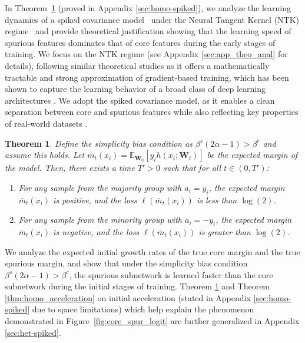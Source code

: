 \documentclass[letter,11pt]{article}
\newtheorem{theorem}{Theorem}
\begin{document}
In Theorem~\ref{thm:thm_1} (proved in Appendix \ref{sec:homo-spiked}), we analyze the learning dynamics of a spiked covariance model~\citep{SCM} under the Neural Tangent Kernel (NTK) regime~\citep{NTK_1} and provide theoretical justification showing that the learning speed of spurious features dominates that of core features during the early stages of training. We focus on the NTK regime (see Appendix \ref{sec:app_theo_anal} for details), following similar theoretical studies \citep{NTK, SPARE} as it offers a mathematically tractable and strong approximation of gradient-based training, which has been shown to capture the learning behavior of a broad class of deep learning architectures \citep{NTK_1, NTK_2}. We adopt the spiked covariance model, as it enables a clean separation between core and spurious features while also reflecting key properties of real-world datasets \citep{SCM_1}.


\begin{theorem}\label{thm:thm_1}
    Define the simplicity bias condition as $\beta^s (2\alpha - 1) > \beta^c$ and assume this holds. Let $\bar{m}_t(x_i) = \mathbb{E}_{\mathbf{W}_0}[y_i h(x_i; \mathbf{W}_t)]$ be the expected margin of the model.
Then, there exists a time $T' > 0$ such that for all $t \in (0, T')$:
\begin{enumerate}
    \item For any sample from the majority group with  $a_i=y_i$, the expected margin $\bar{m}_t(x_i)$ is positive, and the loss $\ell(\bar{m}_t(x_i))$ is less than $\log(2)$.
    \item For any sample from the minority group with $a_i=-y_i$, the expected margin $\bar{m}_t(x_i)$ is negative, and the loss $\ell(\bar{m}_t(x_i))$ is greater than $\log(2)$.
\end{enumerate}
\end{theorem}

\noindent We analyze the expected initial growth rates of the true core margin and the true spurious margin, and show that under the simplicity bias condition $\beta^s (2\alpha - 1) > \beta^c$, the spurious subnetwork is learned faster than the core subnetwork during the initial stages of training. Theorem \ref{thm:thm_1} and Theorem \ref{thm:homo_acceleration} on initial acceleration (stated in Appendix \ref{sec:homo-spiked} due to space limitations) which help explain the phenomenon demonstrated in Figure~\ref{fig:core_spur_logit} are further generalized in Appendix \ref{sec:het-spiked}.
\end{document}

